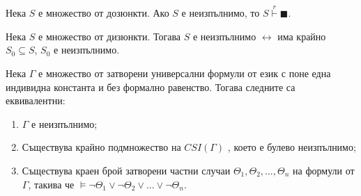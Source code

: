 \documentclass{article}
\begin{document}
\begin{thm}
Нека $S$ е множество от дозюнкти. Ако $S$ е неизпълнимо, то $S \overset{r}{\vdash} \blacksquare$.

\setcounter{conseq}{0}
\begin{conseq}
Нека $S$ е множество от дизюнкти. Тогава $S$ е неизпълнимо $\longleftrightarrow$ има крайно $S_0 \subseteq S$, $S_0$ е неизпълнимо.
\end{conseq}

\end{thm}

\begin{thm}
Нека $\Gamma$ е множество от затворени универсални формули от език с поне една индивидна константа и без формално равенство. Тогава следните са еквивалентни:
\begin{enumerate}
\item $\Gamma$ е неизпълнимо;
\item Съществува крайно подмножество на $CSI(\Gamma)$ , което е булево неизпълнимо;
\item Съществува краен брой затворени частни случаи $\Theta_1, \Theta_2, \ldots, \Theta_n$ на формули от $\Gamma$, такива че $\models \neg\Theta_1\lor \neg\Theta_2\lor\ldots\lor\neg\Theta_n$.
\end{enumerate}
\end{thm}

\fi
\end{document}
